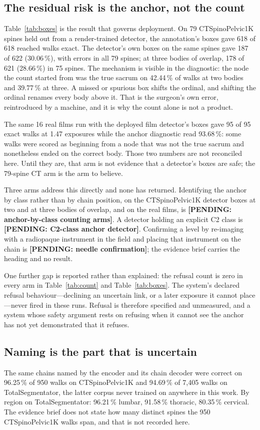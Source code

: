 \documentclass[11pt,letterpaper]{article}
\begin{document}
\subsection*{The residual risk is the anchor, not the count}
Table~\ref{tab:boxes} is the result that governs deployment. On 79 CTSpinoPelvic1K spines held out from a
render-trained detector, the annotation's boxes gave 618 of 618 reached walks exact. The detector's own
boxes on the same spines gave 187 of 622 (30.06\,\%), with errors in all 79 spines; at three bodies of
overlap, 178 of 621 (28.66\,\%) in 75 spines. The mechanism is visible in the diagnostic: the node the count
started from was the true sacrum on 42.44\,\% of walks at two bodies and 39.77\,\% at three. A missed or
spurious box shifts the ordinal, and shifting the ordinal renames every body above it. That is the surgeon's
own error, reintroduced by a machine, and it is why the count alone is not a product.

The same 16 real films run with the deployed film detector's boxes gave 95 of 95 exact walks at 1.47
exposures while the anchor diagnostic read 93.68\,\%: some walks were scored as beginning from a node that
was not the true sacrum and nonetheless ended on the correct body. Those two numbers are not reconciled
here. Until they are, that arm is not evidence that a detector's boxes are safe; the 79-spine CT arm is the
arm to believe.

Three arms address this directly and none has returned. Identifying the anchor by class rather than by
chain position, on the CTSpinoPelvic1K detector boxes at two and at three bodies of overlap, and on the real
films, is \textbf{[PENDING: anchor-by-class counting arms]}. A detector holding an explicit C2 class is
\textbf{[PENDING: C2-class anchor detector]}. Confirming a level by re-imaging with a radiopaque instrument
in the field and placing that instrument on the chain is \textbf{[PENDING: needle confirmation]}; the
evidence brief carries the heading and no result.

One further gap is reported rather than explained: the refusal count is zero in every arm in
Table~\ref{tab:count} and Table~\ref{tab:boxes}. The system's declared refusal behaviour---declining an
uncertain link, or a later exposure it cannot place---never fired in these runs. Refusal is therefore
specified and unmeasured, and a system whose safety argument rests on refusing when it cannot see the anchor
has not yet demonstrated that it refuses.

\subsection*{Naming is the part that is uncertain}
The same chains named by the encoder and its chain decoder were correct on 96.25\,\% of 950 walks on
CTSpinoPelvic1K and 94.69\,\% of 7,405 walks on TotalSegmentator, the latter corpus never trained on
anywhere in this work. By region on TotalSegmentator: 96.21\,\% lumbar, 91.58\,\% thoracic, 80.35\,\%
cervical. The evidence brief does not state how many distinct spines the 950 CTSpinoPelvic1K walks span,
and that is not recorded here.
\end{document}
